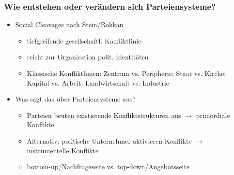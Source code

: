 \documentclass{beamer}
\begin{document}
\begin{frame}
    \frametitle{Wie entstehen oder verändern sich Parteiensysteme?}
    \begin{itemize}
        \item Social Cleavages nach Stein/Rokkan
        \begin{itemize}
            \item tiefgreifende gesellschaftl. Konfliktlinie
            \item reicht zur Organisation polit. Identitäten
            \item Klassische Konfliktlinien: Zentrum vs. Peripherie;
                Staat vs. Kirche; Kapital vs. Arbeit; Landwirtschaft
                vs. Industrie
        \end{itemize}
        \item Was sagt das über Parteiensysteme aus?
        \begin{itemize}
            \item Parteien beuten existierende Konfliktstrukturen aus\newline
            $\rightarrow$ primordiale Konflikte
            \item Alternativ: politische Unternehmer aktivieren Konflikte\newline
            $\rightarrow$ instrumentelle Konflikte
            \item bottom-up/Nachfrageseite vs. top-down/Angebotsseite
        \end{itemize}
    \end{itemize}
\end{frame}
\end{document}
